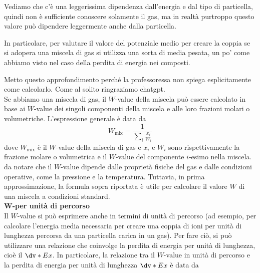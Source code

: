 Vediamo che c'è una leggerissima dipendenza dall'energia e dal tipo di particella, quindi non è sufficiente conoscere solamente il gas, ma in realtà purtroppo questo valore può dipendere leggermente anche dalla particella.

In particolare, per valutare il valore del potenziale medio per creare la coppia se si adopera una miscela di gas si utilizza una sorta di media pesata, un po' come abbiamo visto nel caso della perdita di energia nei composti.

\begin{approfondimento}
   \footnotesize
   Metto questo approfondimento perché la professoressa non spiega esplicitamente come calcolarlo. Come al solito ringraziamo chatgpt.\\
   Se abbiamo una miscela di gas, il $W$-value della miscela può essere calcolato in base ai $W$-value dei singoli componenti della miscela e alle loro frazioni molari o volumetriche. L'espressione generale è data da
   \begin{equation*}
      W_{\text{mix}} = \frac{1}{\sum_i \frac{x_i}{W_i}}
   \end{equation*}
   dove $W_{\text{mix}}$ è il $W$-value della miscela di gas e $x_i$ e $W_i$ sono rispettivamente la frazione molare o volumetrica e il $W$-value del componente $i$-esimo nella miscela.\\
   \E da notare che il $W$-value dipende dalle proprietà fisiche del gas e dalle condizioni operative, come la pressione e la temperatura. Tuttavia, in prima approssimazione, la formula sopra riportata è utile per calcolare il valore $W$ di una miscela a condizioni standard.\\[0.2cm]
   \textbf{$\boldsymbol{W}$-per unità di percorso}\\
   Il $W$-value si può esprimere anche in termini di unità di percorso (ad esempio, per calcolare l'energia media necessaria per creare una coppia di ioni per unità di lunghezza percorsa da una particella carica in un gas). Per fare ciò, si può utilizzare una relazione che coinvolge la perdita di energia per unità di lunghezza, cioè il $\dv*{E}{x}$. In particolare, la relazione tra il $W$-value in unità di percorso e la perdita di energia per unità di lunghezza $\dv*{E}{x}$ è data da

\end{approfondimento}

